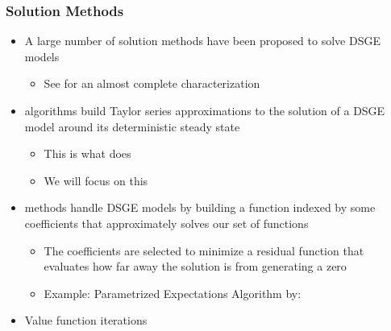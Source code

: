 \documentclass[xcolor=dvipsnames,handout,aspectratio=169]{beamer}
\let\oldcite=\cite
\renewcommand\cite[1]{\hypersetup{linkcolor=blue} \hyperlink{#1}{\oldcite{#1}}}
\begin{document}
\begin{frame}[c]\frametitle {\textbf{Solution Methods}} \label{conclusion}
\begin{itemize}
\item A large number of solution methods have been proposed to solve DSGE models
\begin{itemize}
    \item See \cite{fernandez2016solution} for an almost complete characterization
\end{itemize}
\item {\color{Magenta}{Perturbation}} algorithms build Taylor series approximations to the solution of a DSGE model around its deterministic steady state 
\begin{itemize}
    \item This is what {\color{blue}{Dynare}} does
    \item We will focus on this
\end{itemize}
\item {\color{Magenta}{Projection}} methods handle DSGE models by building a function indexed by some coefficients that approximately solves our set of functions
\begin{itemize}
    \item The coefficients are selected to minimize a residual function that evaluates how far away the solution is from generating a zero 
    \item Example: Parametrized Expectations Algorithm by: \cite{den1990solving}
\end{itemize}
\item Value function iterations 
\end{itemize}
\end{frame}



 
\end{document}
